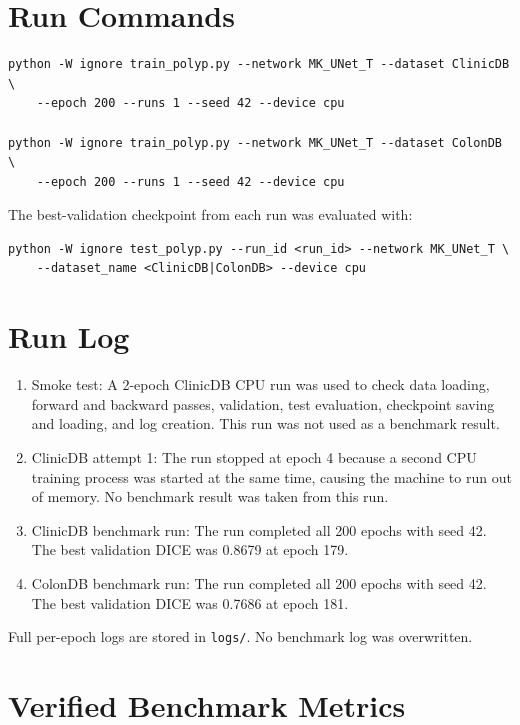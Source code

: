 \documentclass[10pt,a4paper]{article}
\begin{document}
\section{Run Commands}

\begin{verbatim}
python -W ignore train_polyp.py --network MK_UNet_T --dataset ClinicDB \
    --epoch 200 --runs 1 --seed 42 --device cpu

python -W ignore train_polyp.py --network MK_UNet_T --dataset ColonDB \
    --epoch 200 --runs 1 --seed 42 --device cpu
\end{verbatim}

The best-validation checkpoint from each run was evaluated with:

\begin{verbatim}
python -W ignore test_polyp.py --run_id <run_id> --network MK_UNet_T \
    --dataset_name <ClinicDB|ColonDB> --device cpu
\end{verbatim}

\section{Run Log}

\begin{enumerate}
\item Smoke test: A 2-epoch ClinicDB CPU run was used to check data loading, forward and backward passes, validation, test evaluation, checkpoint saving and loading, and log creation. This run was not used as a benchmark result.

\item ClinicDB attempt 1: The run stopped at epoch 4 because a second CPU training process was started at the same time, causing the machine to run out of memory. No benchmark result was taken from this run.

\item ClinicDB benchmark run: The run completed all 200 epochs with seed 42. The best validation DICE was 0.8679 at epoch 179.

\item ColonDB benchmark run: The run completed all 200 epochs with seed 42. The best validation DICE was 0.7686 at epoch 181.
\end{enumerate}

Full per-epoch logs are stored in \texttt{logs/}. No benchmark log was overwritten.

\section{Verified Benchmark Metrics}
\end{document}
